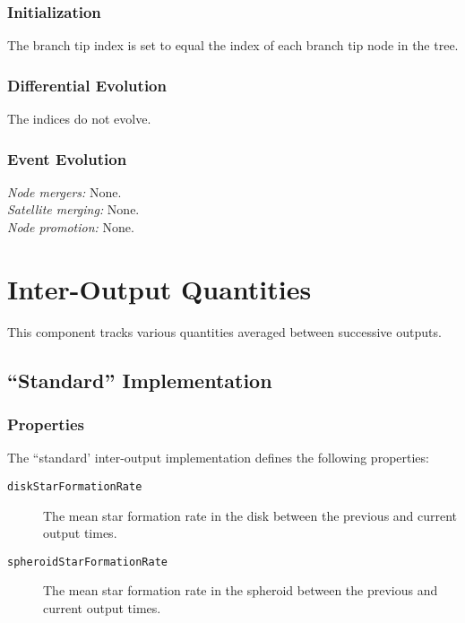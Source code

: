 \subsubsection{Initialization}

The branch tip index is set to equal the index of each branch tip node in the tree.

\subsubsection{Differential Evolution}

The indices do not evolve.

\subsubsection{Event Evolution}

\noindent\emph{Node mergers:} None.\\

\noindent\emph{Satellite merging:} None.\\

\noindent\emph{Node promotion:} None.\\

\section{Inter-Output Quantities}\label{sec:ComponentInterOutput}

This \gls{component} tracks various quantities averaged between successive outputs.

\subsection{``Standard'' Implementation}

\subsubsection{Properties}

The ``standard' inter-output implementation defines the following properties:
\begin{description}
 \item [{\tt diskStarFormationRate}] The mean star formation rate in the disk between the previous and current output times.
 \item [{\tt spheroidStarFormationRate}] The mean star formation rate in the spheroid between the previous and current output times.
\end{description}

